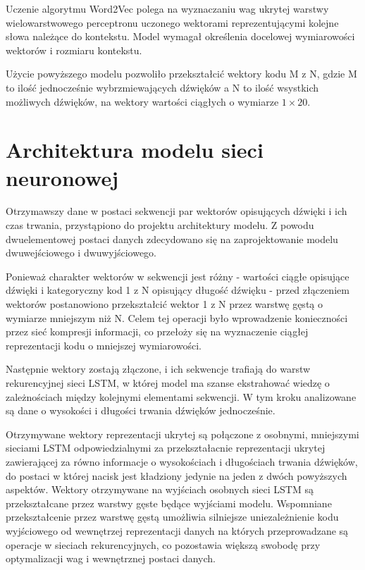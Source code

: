 {{        Uczenie algorytmu Word2Vec polega na wyznaczaniu wag ukrytej warstwy wielowarstwowego perceptronu
        uczonego wektorami reprezentującymi kolejne słowa należące do kontekstu.
        Model wymagał określenia docelowej wymiarowości wektorów i rozmiaru kontekstu. 

        Użycie powyższego modelu pozwoliło przekształcić  wektory kodu  M\,\,z\,\,N, gdzie M to ilość jednocześnie wybrzmiewających dźwięków a N to ilość wsystkich możliwych dźwięków, na wektory wartości ciągłych o wymiarze \(1 \times 20\).
    }
    
    \section{Architektura modelu sieci neuronowej}\label{chap:main_model}
    {
        Otrzymawszy dane w postaci sekwencji par wektorów opisujących dźwięki i ich czas trwania,
        przystąpiono do projektu architektury modelu. Z powodu dwuelementowej postaci danych
        zdecydowano się na zaprojektowanie modelu dwuwejściowego i dwuwyjściowego.

        Ponieważ charakter wektorów w sekwencji jest różny - wartości ciągłe opisujące dźwięki i 
        kategoryczny kod  1\,\,z\,\,N opisujący długość dźwięku - przed złączeniem wektorów postanowiono 
        przekształcić wektor  1\,\,z\,\,N przez warstwę gęstą o wymiarze mniejszym niż N. Celem tej operacji
        było wprowadzenie konieczności przez sieć kompresji informacji, co przełoży się 
        na wyznaczenie ciągłej reprezentacji kodu o mniejszej wymiarowości. 

        Następnie wektory zostają złączone, i ich sekwencje trafiają do warstw rekurencyjnej sieci LSTM, w której model ma szanse ekstrahować wiedzę o zależnościach między kolejnymi elementami sekwencji. W tym kroku analizowane są dane o wysokości i długości trwania dźwięków jednocześnie.

        Otrzymywane wektory reprezentacji ukrytej są połączone z osobnymi, 
        mniejszymi sieciami LSTM odpowiedzialnymi za przekształacnie reprezentacji 
        ukrytej zawierającej za równo informacje o wysokościach i długościach trwania dźwięków, 
        do postaci w której nacisk jest kładziony jedynie na jeden z dwóch powyższych aspektów. 
        Wektory otrzymywane na wyjściach osobnych sieci LSTM są przekształcane przez warstwy gęste będące wyjściami modelu. 
        Wspomniane przekształcenie przez warstwę gęstą umożliwia silniejsze uniezależnienie kodu 
        wyjściowego od wewnętrzej reprezentacji danych na których przeprowadzane są operacje 
        w sieciach rekurencyjnych, co pozostawia większą swobodę przy optymalizacji wag i wewnętrznej postaci danych.
        
}}
